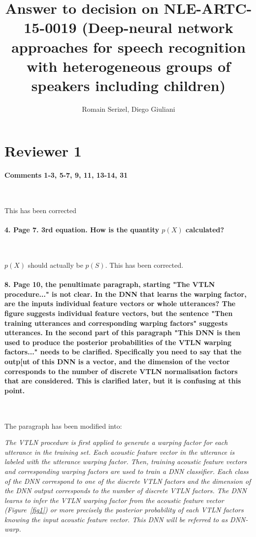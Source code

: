 \documentclass[]{article}
\title{Answer to decision on NLE-ARTC-15-0019 (Deep-neural network approaches for speech recognition with heterogeneous groups of speakers including children)}
\author{Romain Serizel, Diego Giuliani}
\begin{document}
\maketitle


\section{Reviewer 1}
\paragraph{Comments 1-3, 5-7, 9, 11, 13-14, 31}

~

This has been corrected
\paragraph{4. Page 7. 3rd equation. How is the quantity $p(X)$ calculated?}

~

$p(X)$ should actually be $p(S)$. This has been corrected.


\paragraph{8. Page 10, the penultimate paragraph, starting "The VTLN procedure..." is not clear. In the DNN that learns the warping
factor, are the inputs individual feature vectors or whole utterances? The figure suggests individual feature vectors, but the
sentence "Then training utterances and corresponding warping factors" suggests utterances. In the second part of this paragraph "This DNN is then used to produce the posterior probabilities of the VTLN warping factors..." needs to be clarified. Specifically you need to
say that the outp[ut of this DNN is a vector, and the dimension of the vector corresponds to the number of discrete VTLN normalisation
factors that are considered. This is clarified later, but it is confusing at this point.}

~

The paragraph has been modified into:

\textit{The VTLN procedure is first applied to generate a warping factor for each  utterance in the  training set. Each acoustic feature vector in the utterance is labeled with the utterance warping factor. Then, training acoustic feature vectors and corresponding warping factors are used to train a DNN classifier. Each class of the DNN correspond to one of the discrete VTLN factors and the dimension of the DNN output corresponds to the number of discrete VTLN factors. The DNN learns to infer the VTLN warping factor from the acoustic feature vector (Figure~\ref{fig1}) or more precisely the posterior probability of each VTLN factors knowing the input acoustic feature vector. This DNN will be referred to as DNN-warp.}
\end{document}
